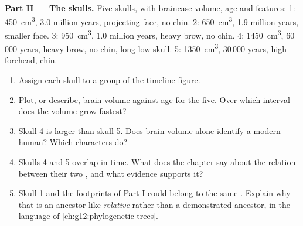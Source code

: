 \begin{problem}
\medskip
\noindent\textbf{Part II --- The skulls.}
Five skulls, with braincase volume, age and features:
1: \qty{450}{cm^3}, 3.0 million years, projecting face, no chin.
2: \qty{650}{cm^3}, 1.9 million years, smaller face.
3: \qty{950}{cm^3}, 1.0 million years, heavy brow, no chin.
4: \qty{1450}{cm^3}, 60\,000 years, heavy brow, no chin, long low
skull.
5: \qty{1350}{cm^3}, 30\,000 years, high forehead, chin.
\begin{enumerate}[resume]
  \item Assign each skull to a group of the timeline figure.
  \item Plot, or describe, brain volume against age for the five. Over
        which interval does the volume grow fastest?
  \item Skull 4 is larger than skull 5. Does brain volume alone
        identify a modern human? Which characters do?
  \item Skulls 4 and 5 overlap in time. What does the chapter say
        about the relation between their two , and what
        evidence supports it?
  \item Skull 1 and the footprints of Part I could belong to the same
        . Explain why that  is an ancestor-like
        \emph{relative} rather than a demonstrated ancestor, in the
        language of \cref{ch:g12:phylogenetic-trees}.
\end{enumerate}


\end{problem}
